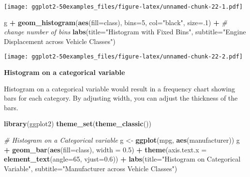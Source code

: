 \documentclass[a4paper]{article}
\newenvironment{Shaded}{\begin{snugshade}}{\end{snugshade}}
\newcommand{\KeywordTok}[1]{\textcolor[rgb]{0.13,0.29,0.53}{\textbf{#1}}}
\newcommand{\DataTypeTok}[1]{\textcolor[rgb]{0.13,0.29,0.53}{#1}}
\newcommand{\DecValTok}[1]{\textcolor[rgb]{0.00,0.00,0.81}{#1}}
\newcommand{\FloatTok}[1]{\textcolor[rgb]{0.00,0.00,0.81}{#1}}
\newcommand{\StringTok}[1]{\textcolor[rgb]{0.31,0.60,0.02}{#1}}
\newcommand{\CommentTok}[1]{\textcolor[rgb]{0.56,0.35,0.01}{\textit{#1}}}
\newcommand{\OperatorTok}[1]{\textcolor[rgb]{0.81,0.36,0.00}{\textbf{#1}}}
\newcommand{\NormalTok}[1]{#1}
\begin{document}
\texttt{[image: ggplot2-50examples\_files/figure-latex/unnamed-chunk-22-1.pdf]}

\begin{Shaded}
\begin{Highlighting}[]
\NormalTok{g }\OperatorTok{+}\StringTok{ }\KeywordTok{geom_histogram}\NormalTok{(}\KeywordTok{aes}\NormalTok{(}\DataTypeTok{fill=}\NormalTok{class), }
                   \DataTypeTok{bins=}\DecValTok{5}\NormalTok{, }
                   \DataTypeTok{col=}\StringTok{"black"}\NormalTok{, }
                   \DataTypeTok{size=}\NormalTok{.}\DecValTok{1}\NormalTok{) }\OperatorTok{+}\StringTok{   }\CommentTok{# change number of bins}
\StringTok{  }\KeywordTok{labs}\NormalTok{(}\DataTypeTok{title=}\StringTok{"Histogram with Fixed Bins"}\NormalTok{, }
       \DataTypeTok{subtitle=}\StringTok{"Engine Displacement across Vehicle Classes"}\NormalTok{) }
\end{Highlighting}
\end{Shaded}

\texttt{[image: ggplot2-50examples\_files/figure-latex/unnamed-chunk-22-2.pdf]}

\newpage

\textbf{Histogram on a categorical variable}

Histogram on a categorical variable would result in a frequency chart
showing bars for each category. By adjusting width, you can adjust the
thickness of the bars.

\begin{Shaded}
\begin{Highlighting}[]
\KeywordTok{library}\NormalTok{(ggplot2)}
\KeywordTok{theme_set}\NormalTok{(}\KeywordTok{theme_classic}\NormalTok{())}

\CommentTok{# Histogram on a Categorical variable}
\NormalTok{g <-}\StringTok{ }\KeywordTok{ggplot}\NormalTok{(mpg, }\KeywordTok{aes}\NormalTok{(manufacturer))}
\NormalTok{g }\OperatorTok{+}\StringTok{ }\KeywordTok{geom_bar}\NormalTok{(}\KeywordTok{aes}\NormalTok{(}\DataTypeTok{fill=}\NormalTok{class), }\DataTypeTok{width =} \FloatTok{0.5}\NormalTok{) }\OperatorTok{+}\StringTok{ }
\StringTok{  }\KeywordTok{theme}\NormalTok{(}\DataTypeTok{axis.text.x =} \KeywordTok{element_text}\NormalTok{(}\DataTypeTok{angle=}\DecValTok{65}\NormalTok{, }\DataTypeTok{vjust=}\FloatTok{0.6}\NormalTok{)) }\OperatorTok{+}\StringTok{ }
\StringTok{  }\KeywordTok{labs}\NormalTok{(}\DataTypeTok{title=}\StringTok{"Histogram on Categorical Variable"}\NormalTok{, }
       \DataTypeTok{subtitle=}\StringTok{"Manufacturer across Vehicle Classes"}\NormalTok{) }
\end{Highlighting}
\end{Shaded}
\end{document}
